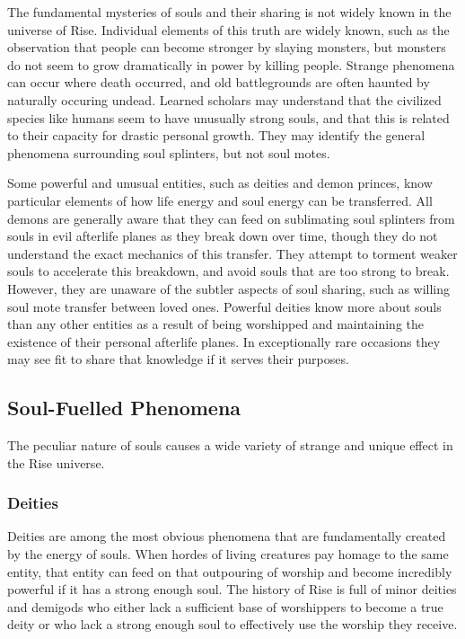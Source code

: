       The fundamental mysteries of souls and their sharing is not widely known in the universe of Rise.
      Individual elements of this truth are widely known, such as the observation that people can become stronger by slaying monsters, but monsters do not seem to grow dramatically in power by killing people.
      Strange phenomena can occur where death occurred, and old battlegrounds are often haunted by naturally occuring undead.
      Learned scholars may understand that the civilized species like humans seem to have unusually strong souls, and that this is related to their capacity for drastic personal growth.
      They may identify the general phenomena surrounding soul splinters, but not soul motes.

      Some powerful and unusual entities, such as deities and demon princes, know particular elements of how life energy and soul energy can be transferred.
      All demons are generally aware that they can feed on sublimating soul splinters from souls in evil afterlife planes as they break down over time, though they do not understand the exact mechanics of this transfer.
      They attempt to torment weaker souls to accelerate this breakdown, and avoid souls that are too strong to break.
      However, they are unaware of the subtler aspects of soul sharing, such as willing soul mote transfer between loved ones.
      Powerful deities know more about souls than any other entities as a result of being worshipped and maintaining the existence of their personal afterlife planes.
      In exceptionally rare occasions they may see fit to share that knowledge if it serves their purposes.

  \subsection{Soul-Fuelled Phenomena}

    The peculiar nature of souls causes a wide variety of strange and unique effect in the Rise universe.

    \subsubsection{Deities}
      Deities are among the most obvious phenomena that are fundamentally created by the energy of souls.
      When hordes of living creatures pay homage to the same entity, that entity can feed on that outpouring of worship and become incredibly powerful if it has a strong enough soul.
      The history of Rise is full of minor deities and demigods who either lack a sufficient base of worshippers to become a true deity or who lack a strong enough soul to effectively use the worship they receive.

